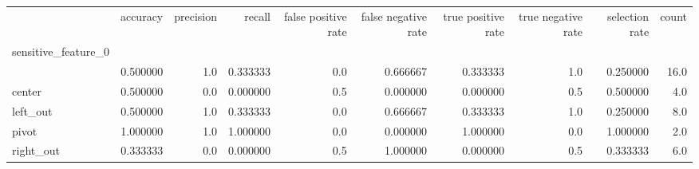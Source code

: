 \begin{tabular}{lrrrrrrrrr}
\toprule
{} &  accuracy &  precision &    recall &  false positive rate &  false negative rate &  true positive rate &  true negative rate &  selection rate &  count \\
sensitive\_feature\_0 &           &            &           &                      &                      &                     &                     &                 &        \\
\midrule
                    &  0.500000 &        1.0 &  0.333333 &                  0.0 &             0.666667 &            0.333333 &                 1.0 &        0.250000 &   16.0 \\
center              &  0.500000 &        0.0 &  0.000000 &                  0.5 &             0.000000 &            0.000000 &                 0.5 &        0.500000 &    4.0 \\
left\_out            &  0.500000 &        1.0 &  0.333333 &                  0.0 &             0.666667 &            0.333333 &                 1.0 &        0.250000 &    8.0 \\
pivot               &  1.000000 &        1.0 &  1.000000 &                  0.0 &             0.000000 &            1.000000 &                 0.0 &        1.000000 &    2.0 \\
right\_out           &  0.333333 &        0.0 &  0.000000 &                  0.5 &             1.000000 &            0.000000 &                 0.5 &        0.333333 &    6.0 \\
\bottomrule
\end{tabular}
